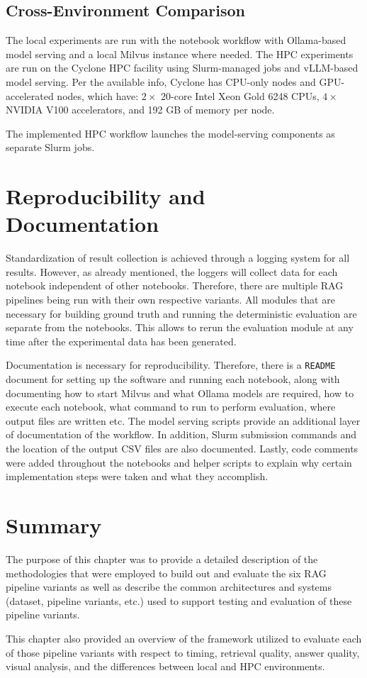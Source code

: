 \subsection{Cross-Environment Comparison}

The local experiments are run with the notebook workflow with Ollama-based model serving and a local Milvus instance where needed. The \ac{HPC} experiments are run on the Cyclone \ac{HPC} \cite{cyi_cyclone} facility using Slurm-managed jobs and \ac{vLLM}-based model serving. Per the available info, Cyclone has CPU-only nodes and GPU-accelerated nodes, which have: \(2\times\) 20-core Intel Xeon Gold 6248 CPUs, \(4\times\) NVIDIA V100 accelerators, and 192 GB of memory per node.

The implemented \ac{HPC} workflow launches the model-serving components as separate Slurm jobs.

\section{Reproducibility and Documentation}

Standardization of result collection is achieved through a logging system for all results. However, as already mentioned, the loggers will collect data for each notebook independent of other notebooks. Therefore, there are multiple \ac{RAG} pipelines being run with their own respective variants. All modules that are necessary for building ground truth and running the deterministic evaluation are separate from the notebooks. This allows to rerun the evaluation module at any time after the experimental data has been generated.

Documentation is necessary for reproducibility. Therefore, there is a \texttt{README} document for setting up the software and running each notebook, along with documenting how to start Milvus and what Ollama models are required, how to execute each notebook, what command to run to perform evaluation, where output files are written etc. The model serving scripts provide an additional layer of documentation of the workflow. In addition, Slurm submission commands and the location of the output CSV files are also documented. Lastly, code comments were added throughout the notebooks and helper scripts to explain why certain implementation steps were taken and what they accomplish.

\section{Summary}

The purpose of this chapter was to provide a detailed description of the methodologies that were employed to build out and evaluate the six \ac{RAG} pipeline variants as well as describe the common architectures and systems (dataset, pipeline variants, etc.) used to support testing and evaluation of these pipeline variants.

This chapter also provided an overview of the framework utilized to evaluate each of those pipeline variants with respect to timing, retrieval quality, answer quality, visual analysis, and the differences between local and \acf{HPC} environments.